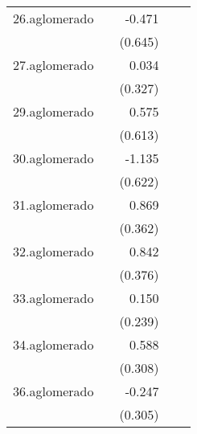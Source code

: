 {\begin{longtable}{l*{4}{D{.}{.}{-1}}}
\addlinespace
26.aglomerado&                     &      -0.471         &                     &                     \\
            &                     &     (0.645)         &                     &                     \\
\addlinespace
27.aglomerado&                     &       0.034         &                     &                     \\
            &                     &     (0.327)         &                     &                     \\
\addlinespace
29.aglomerado&                     &       0.575         &                     &                     \\
            &                     &     (0.613)         &                     &                     \\
\addlinespace
30.aglomerado&                     &      -1.135         &                     &                     \\
            &                     &     (0.622)         &                     &                     \\
\addlinespace
31.aglomerado&                     &       0.869\sym{*}  &                     &                     \\
            &                     &     (0.362)         &                     &                     \\
\addlinespace
32.aglomerado&                     &       0.842\sym{*}  &                     &                     \\
            &                     &     (0.376)         &                     &                     \\
\addlinespace
33.aglomerado&                     &       0.150         &                     &                     \\
            &                     &     (0.239)         &                     &                     \\
\addlinespace
34.aglomerado&                     &       0.588         &                     &                     \\
            &                     &     (0.308)         &                     &                     \\
\addlinespace
36.aglomerado&                     &      -0.247         &                     &                     \\
            &                     &     (0.305)         &                     &                     \\

\end{longtable}}

